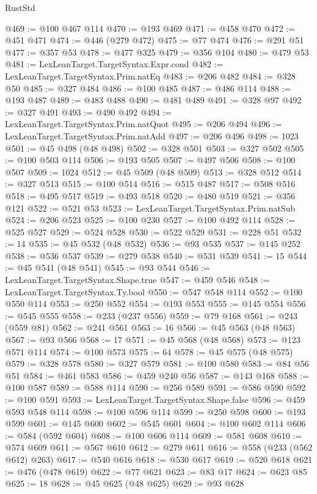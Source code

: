 \begin{lexlean}{RustStd}
\begin{coremodule}
@469 := @100 @467 @114
@470 := @193 @469
@471 := @458 @470
@472 := @451 @471
@474 := @446 (@279 @472)
@475 := @77 @474
@476 := @291 @51
@477 := @357 @53
@478 := @477 @325
@479 := @356 @104
@480 := @479 @53
@481 := LexLeanTarget.TargetSyntax.Expr.cond
@482 := LexLeanTarget.TargetSyntax.Prim.natEq
@483 := @206 @482
@484 := @328 @50
@485 := @327 @484
@486 := @100 @485
@487 := @486 @114
@488 := @193 @487
@489 := @483 @488
@490 := @481 @489
@491 := @328 @97
@492 := @327 @491
@493 := @490 @492
@494 := LexLeanTarget.TargetSyntax.Prim.natQuot
@495 := @206 @494
@496 := LexLeanTarget.TargetSyntax.Prim.natAdd
@497 := @206 @496
@498 := 1023
@501 := @45 @498 (@48 @498)
@502 := @328 @501
@503 := @327 @502
@505 := @100 @503 @114
@506 := @193 @505
@507 := @497 @506
@508 := @100 @507
@509 := 1024
@512 := @45 @509 (@48 @509)
@513 := @328 @512
@514 := @327 @513
@515 := @100 @514
@516 := @515 @487
@517 := @508 @516
@518 := @495 @517
@519 := @493 @518
@520 := @480 @519
@521 := @356 @121
@522 := @521 @53
@523 := LexLeanTarget.TargetSyntax.Prim.natSub
@524 := @206 @523
@525 := @100 @230
@527 := @100 @492 @114
@528 := @525 @527
@529 := @524 @528
@530 := @522 @529
@531 := @228 @51
@532 := 14
@535 := @45 @532 (@48 @532)
@536 := @93 @535
@537 := @145 @252
@538 := @536 @537
@539 := @279 @538
@540 := @531 @539
@541 := 15
@544 := @45 @541 (@48 @541)
@545 := @93 @544
@546 := LexLeanTarget.TargetSyntax.Shape.true
@547 := @459 @546
@548 := LexLeanTarget.TargetSyntax.Ty.bool
@550 := @547 @548 @114
@552 := @100 @550 @114
@553 := @250 @552
@554 := @193 @553
@555 := @145 @554
@556 := @545 @555
@558 := @233 (@237 @556)
@559 := @79 @168
@561 := @243 (@559 @81)
@562 := @241 @561
@563 := 16
@566 := @45 @563 (@48 @563)
@567 := @93 @566
@568 := 17
@571 := @45 @568 (@48 @568)
@573 := @123 @571 @114
@574 := @100 @573
@575 := 64
@578 := @45 @575 (@48 @575)
@579 := @328 @578
@580 := @327 @579
@581 := @100 @580
@583 := @84 @56 @51
@584 := @461 @583
@586 := @459 @240 @56
@587 := @143 @168
@588 := @100 @587
@589 := @588 @114
@590 := @256 @589
@591 := @586 @590
@592 := @100 @591
@593 := LexLeanTarget.TargetSyntax.Shape.false
@596 := @459 @593 @548 @114
@598 := @100 @596 @114
@599 := @250 @598
@600 := @193 @599
@601 := @145 @600
@602 := @545 @601
@604 := @100 @602 @114
@606 := @584 (@592 @604)
@608 := @100 @606 @114
@609 := @581 @608
@610 := @574 @609
@611 := @567 @610
@612 := @279 @611
@616 := @558 (@233 (@562 @612) @263)
@617 := @540 @616
@618 := @530 @617
@619 := @520 @618
@621 := @476 (@478 @619)
@622 := @77 @621
@623 := @83 @17
@624 := @623 @85
@625 := 18
@628 := @45 @625 (@48 @625)
@629 := @93 @628

\end{coremodule}
\end{lexlean}
